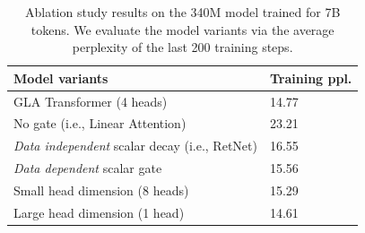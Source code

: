 \begin{table}

\centering
\small 
        \begin{tabular}{ll}
        \toprule[0.5mm]
     Model variants  &   Training ppl. \\
      \bottomrule
        {GLA Transformer} (4 heads)  & 14.77 \\
\hspace{2mm} {No gate} (i.e., Linear Attention) & 23.21\\
\hspace{2mm} {\emph{Data independent} scalar decay} (i.e., RetNet) & 16.55 \\
\hspace{2mm} {\emph{Data dependent} scalar gate} & 15.56 \\
\hspace{2mm} {Small head dimension (8 heads)} & 15.29 \\
\hspace{2mm} {Large head dimension (1 head)} &  14.61 \\
        \bottomrule
        \end{tabular}
    \vspace{-2mm}
    \caption{Ablation study results on the 340M model trained for 7B tokens. We evaluate the model variants via the average perplexity of the last 200 training steps. 
    }
        \label{tab:ablation}

%
\end{table}

